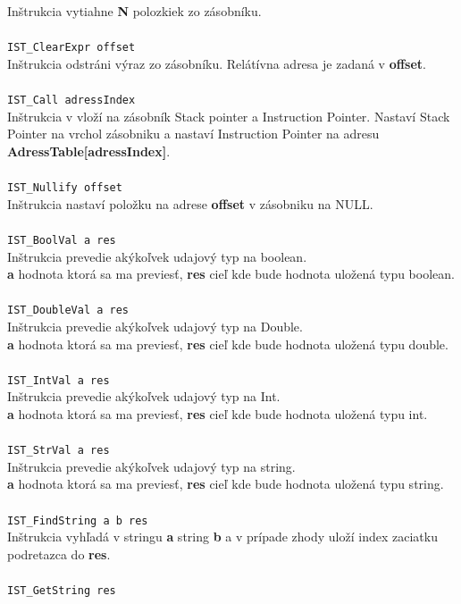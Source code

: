 \documentclass[12pt,a4paper,titlepage,final]{article}
\begin{document}
Inštrukcia vytiahne \textbf{N} polozkiek zo zásobníku.\\
\\\texttt{IST\_ClearExpr offset} \\
Inštrukcia odstráni výraz zo zásobníku. Relátívna adresa je zadaná v \textbf{offset}.\\
\\\texttt{IST\_Call adressIndex}\\
Inštrukcia v vloží na zásobník Stack pointer a Instruction Pointer. Nastaví
Stack Pointer na vrchol zásobniku a nastaví Instruction Pointer na adresu
\textbf{AdressTable[adressIndex]}.\\
\\\texttt{IST\_Nullify offset}\\
Inštrukcia nastaví položku na adrese \textbf{offset} v zásobniku na NULL.\\
\\\texttt{IST\_BoolVal a res } \\
Inštrukcia prevedie akýkoľvek udajový typ na boolean.\\
\textbf{a} hodnota ktorá sa ma previesť, \textbf{res} cieľ kde bude hodnota uložená typu
boolean. \\
\\\texttt{IST\_DoubleVal a res } \\
Inštrukcia prevedie akýkoľvek udajový typ na Double.\\
\textbf{a} hodnota ktorá sa ma previesť, \textbf{res} cieľ kde bude hodnota uložená typu
double. \\
\\\texttt{IST\_IntVal a res } \\
Inštrukcia prevedie akýkoľvek udajový typ na Int.\\
\textbf{a} hodnota ktorá sa ma previesť, \textbf{res} cieľ kde bude hodnota uložená typu
int. \\
\\\texttt{IST\_StrVal a res } \\
Inštrukcia prevedie akýkoľvek udajový typ na string.\\
\textbf{a} hodnota ktorá sa ma previesť, \textbf{res} cieľ kde bude hodnota uložená typu
string. \\
\\\texttt{IST\_FindString a b res} \\
Inštrukcia vyhľadá v stringu \textbf{a} string \textbf{b} a v prípade zhody
uloží index zaciatku podretazca do \textbf{res}.\\
\\\texttt{IST\_GetString res} \\
\end{document}
